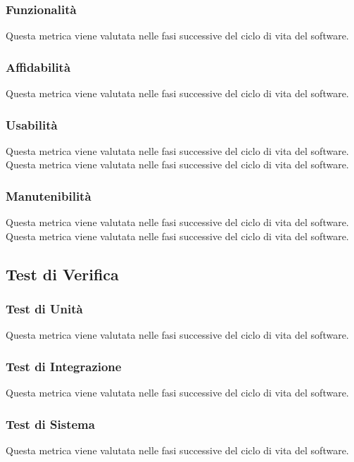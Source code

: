 		\subsubsection{Funzionalità}
				Questa metrica viene valutata nelle fasi successive del ciclo di vita del software.
		\subsubsection{Affidabilità}
				Questa metrica viene valutata nelle fasi successive del ciclo di vita del software.
		\subsubsection{Usabilità}
				Questa metrica viene valutata nelle fasi successive del ciclo di vita del software.
				Questa metrica viene valutata nelle fasi successive del ciclo di vita del software.
		\subsubsection{Manutenibilità}
				Questa metrica viene valutata nelle fasi successive del ciclo di vita del software.
				Questa metrica viene valutata nelle fasi successive del ciclo di vita del software.
	
	
	\subsection{Test di Verifica}
		\subsubsection{Test di Unità}
			Questa metrica viene valutata nelle fasi successive del ciclo di vita del software.
		\subsubsection{Test di Integrazione}
			Questa metrica viene valutata nelle fasi successive del ciclo di vita del software.
		\subsubsection{Test di Sistema}
			Questa metrica viene valutata nelle fasi successive del ciclo di vita del software.
